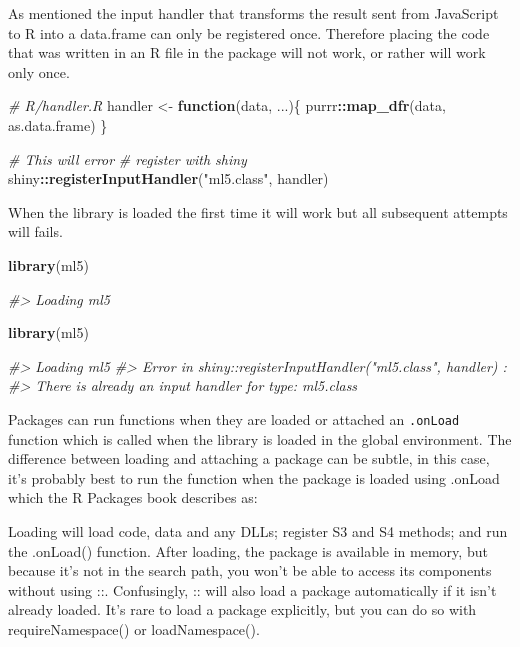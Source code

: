 \documentclass[
  10pt,
]{krantz}
\makeatletter
\newenvironment{Shaded}{\begin{snugshade}}{\end{snugshade}}
\newcommand{\CommentTok}[1]{\textcolor[rgb]{0.37,0.37,0.37}{\textit{#1}}}
\newcommand{\ControlFlowTok}[1]{\textcolor[rgb]{0.27,0.27,0.27}{\textbf{#1}}}
\newcommand{\KeywordTok}[1]{\textcolor[rgb]{0.27,0.27,0.27}{\textbf{#1}}}
\newcommand{\NormalTok}[1]{#1}
\newcommand{\OperatorTok}[1]{\textcolor[rgb]{0.43,0.43,0.43}{\textbf{#1}}}
\newcommand{\StringTok}[1]{\textcolor[rgb]{0.5,0.5,0.5}{#1}}
\renewenvironment{quote}{\begin{VF}}{\end{VF}}
\newenvironment{kframe}{%
\medskip{}
\setlength{\fboxsep}{.8em}
 \def\at@end@of@kframe{}%
 \ifinner\ifhmode%
  \def\at@end@of@kframe{\end{minipage}}%
  \begin{minipage}{\columnwidth}%
 \fi\fi%
 \def\FrameCommand##1{\hskip\@totalleftmargin \hskip-\fboxsep
 \colorbox{shadecolor}{##1}\hskip-\fboxsep
     \hskip-\linewidth \hskip-\@totalleftmargin \hskip\columnwidth}%
 \MakeFramed {\advance\hsize-\width
   \@totalleftmargin\z@ \linewidth\hsize
   \@setminipage}}%
 {\par\unskip\endMakeFramed%
 \at@end@of@kframe}
\renewenvironment{Shaded}{\begin{kframe}}{\end{kframe}}
\makeatother
\begin{document}
As mentioned the input handler that transforms the result sent from JavaScript to R into a data.frame can only be registered once. Therefore placing the code that was written in an R file in the package will not work, or rather will work only once.

\begin{Shaded}
\begin{Highlighting}[]
\CommentTok{\# R/handler.R}
\NormalTok{handler <{-}}\StringTok{ }\ControlFlowTok{function}\NormalTok{(data, ...)\{}
\NormalTok{  purrr}\OperatorTok{::}\KeywordTok{map\_dfr}\NormalTok{(data, as.data.frame)}
\NormalTok{\}}

\CommentTok{\# This will error}
\CommentTok{\# register with shiny}
\NormalTok{shiny}\OperatorTok{::}\KeywordTok{registerInputHandler}\NormalTok{(}\StringTok{"ml5.class"}\NormalTok{, handler)}
\end{Highlighting}
\end{Shaded}

When the library is loaded the first time it will work but all subsequent attempts will fails.

\begin{Shaded}
\begin{Highlighting}[]
\KeywordTok{library}\NormalTok{(ml5)}

\CommentTok{\#> Loading ml5}

\KeywordTok{library}\NormalTok{(ml5)}

\CommentTok{\#> Loading ml5}
\CommentTok{\#> Error in shiny::registerInputHandler("ml5.class", handler) : }
\CommentTok{\#>   There is already an input handler for type: ml5.class}
\end{Highlighting}
\end{Shaded}

Packages can run functions when they are loaded or attached an \texttt{.onLoad} function which is called when the library is loaded in the global environment. The difference between loading and attaching a package can be subtle, in this case, it's probably best to run the function when the package is loaded using .onLoad which the R Packages book describes as:

\begin{quote}
Loading will load code, data and any DLLs; register S3 and S4 methods; and run the .onLoad() function. After loading, the package is available in memory, but because it's not in the search path, you won't be able to access its components without using ::. Confusingly, :: will also load a package automatically if it isn't already loaded. It's rare to load a package explicitly, but you can do so with requireNamespace() or loadNamespace().
\end{quote}
\end{document}
